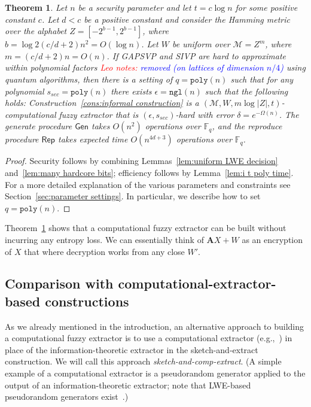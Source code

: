 \documentclass[11pt]{article}
\newcommand{\secref}[1]{\mbox{Section~\ref{#1}}}
\newcommand{\thref}[1]{\mbox{Theorem~\ref{#1}}}
\newcommand{\lemref}[1]{\mbox{Lemma~\ref{#1}}}
\newcommand{\consref}[1]{\mbox{Construction~\ref{#1}}}
\newcommand{\class}[1]{{\ensuremath{\mathsf{#1}}}}
\newcommand{\gen}{\ensuremath{\class{Gen}}\xspace}
\newcommand{\rep}{\ensuremath{\class{Rep}}\xspace}
\newcommand{\zo}{\ensuremath{\{0, 1\}}}
\newcommand{\vect}[1]{\ensuremath{\textbf{#1}}}
\newcommand{\Fq}{\ensuremath{\mathbb{F}_q}}
\newcommand{\poly}{\ensuremath{\mathtt{poly}}\xspace}
\newcommand{\ngl}{\ensuremath{\mathtt{ngl}}\xspace}
\newtheorem{theorem}{Theorem}[section]
\newcommand{\authnote}[2]{{\textcolor{red}{\textsf{#1 notes: }\textcolor{blue}{ #2}}\marginpar{\textcolor{red}{\textbf{!!!!!}}}}}
\newcommand{\authnote}[2]{}
\newcommand{\lnote}[1]{{\authnote{Leo}{#1}}}
\newcommand{\vA}{\vect{A}}
\newcommand{\M}{\mathcal{M}}
\begin{document}
\begin{theorem}
\label{thm:lossless secure extractor log}
Let $n$ be a security parameter and let $t = c\log n$ for some positive constant $c$.    Let $d<c$ be a positive constant and consider the Hamming metric over the alphabet $Z=[-2^{b-1},2^{b-1}]$, where  $b = \log 2(c/d+2) n^2 =O(\log n)$.  Let $W$ be uniform over $\mathcal{M}=Z^m$, where $m={(c/d+2)n}=O(n)$.  If GAPSVP and SIVP are hard to approximate within polynomial factors \lnote{removed (on lattices of dimension $n/4$)}  using quantum algorithms, then there is a setting of $q = \poly(n)$ such that for any polynomial $s_{sec}=\poly(n)$ there exists $\epsilon=\ngl(n)$ such that the following holds: \consref{cons:informal construction} is a $(\M, W, m\log |Z|, t)$-computational fuzzy extractor that is $(\epsilon, s_{sec})$-hard with error $\delta = e^{-\Omega(n)}$.
The generate procedure $\gen$ takes $O(n^2)$ operations over $\Fq$, and the reproduce procedure $\rep$ takes expected time $O(n^{4d+3})$ operations over $\Fq$.
\end{theorem}
\begin{proof}
Security follows by combining Lemmas~\ref{lem:uniform LWE decision} and~\ref{lem:many hardcore bits}; efficiency follows by \lemref{lem:i t poly time}. For a more detailed explanation of the various parameters and constraints see \secref{sec:parameter settings}.  In particular, we describe how to set $q = \poly(n)$.  
\end{proof}


\thref{thm:lossless secure extractor log} shows that a computational fuzzy extractor can be built without incurring any entropy loss.  We can essentially think of $\vA X+W$ as an encryption of $X$ that where decryption works from any close $W'$.

\subsection{Comparison with computational-extractor-based constructions}
\label{sec:prg based comparison}
As we already mentioned in the introduction, an alternative approach to building a computational fuzzy extractor is to use  a computational extractor (e.g.,~\cite{krawczyk2010cryptographic, barak2011leftover, dachman2012computational}) in place of the information-theoretic extractor in the sketch-and-extract construction.  We will call this approach \emph{sketch-and-comp-extract}.  (A simple example of a computational extractor is a pseudorandom generator applied to the output of an information-theoretic extractor; note that LWE-based pseudorandom generators exist~\cite{applebaum2006pseudorandom}.)
\end{document}
